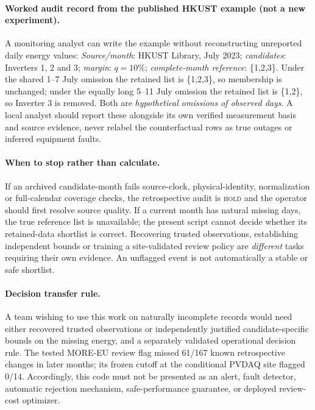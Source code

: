 \documentclass[11pt]{article}
\begin{document}
\paragraph{Worked audit record from the published HKUST example (not a new experiment).}
A monitoring analyst can write the example without reconstructing unreported daily energy values: \emph{Source/month}: HKUST Library, July 2023; \emph{candidates}: Inverters 1, 2 and 3; \emph{margin}: $q=10\%$; \emph{complete-month reference}: \{1,2,3\}. Under the shared 1--7 July omission the retained list is \{1,2,3\}, so membership is unchanged; under the equally long 5--11 July omission the retained list is \{1,2\}, so Inverter 3 is removed. Both are \emph{hypothetical omissions of observed days}. A local analyst should report these alongside its own verified measurement basis and source evidence, never relabel the counterfactual rows as true outages or inferred equipment faults.

\paragraph{When to stop rather than calculate.}
If an archived candidate-month fails source-clock, physical-identity, normalization or full-calendar coverage checks, the retrospective audit is \textsc{hold} and the operator should first resolve source quality. If a current month has natural missing days, the true reference list is unavailable; the present script cannot decide whether its retained-data shortlist is correct. Recovering trusted observations, establishing independent bounds or training a site-validated review policy are \emph{different} tasks requiring their own evidence. An unflagged event is not automatically a stable or safe shortlist.

\paragraph{Decision transfer rule.}
A team wishing to use this work on naturally incomplete records would need either recovered trusted observations or independently justified candidate-specific bounds on the missing energy, and a separately validated operational decision rule. The tested MORE-EU review flag missed 61/167 known retrospective changes in later months; its frozen cutoff at the conditional PVDAQ site flagged 0/14. Accordingly, this code must not be presented as an alert, fault detector, automatic rejection mechanism, safe-performance guarantee, or deployed review-cost optimizer.
\end{document}
